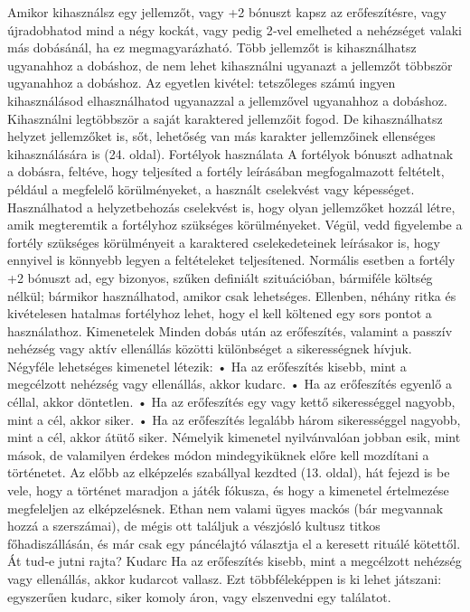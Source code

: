 \documentclass[oneside]{book}
\begin{document}
Amikor kihasználsz egy jellemzőt, vagy +2 bónuszt kapsz az erőfeszítésre, vagy újradobhatod mind a négy kockát, vagy pedig 2‑vel emelheted a nehézséget valaki más dobásánál, ha ez megmagyarázható. Több jellemzőt is kihasználhatsz ugyanahhoz a dobáshoz, de nem lehet kihasználni ugyanazt a jellemzőt többször ugyanahhoz a dobáshoz. Az egyetlen kivétel: tetszőleges számú ingyen kihasználásod elhasználhatod ugyanazzal a jellemzővel ugyanahhoz a dobáshoz.
Kihasználni legtöbbször a saját karaktered jellemzőit fogod. De kihasználhatsz helyzet jellemzőket is, sőt, lehetőség van más karakter jellemzőinek ellenséges kihasználására is (24. oldal).
Fortélyok használata
A fortélyok bónuszt adhatnak a dobásra, feltéve, hogy teljesíted a fortély leírásában megfogalmazott feltételt, például a megfelelő körülményeket, a használt cselekvést vagy képességet. Használhatod a helyzetbehozás cselekvést is, hogy olyan jellemzőket hozzál létre, amik megteremtik a fortélyhoz szükséges körülményeket. Végül, vedd figyelembe a fortély szükséges körülményeit a karaktered cselekedeteinek leírásakor is, hogy ennyivel is könnyebb legyen a feltételeket teljesítened.
Normális esetben a fortély +2 bónuszt ad, egy bizonyos, szűken definiált szituációban, bármiféle költség nélkül; bármikor használhatod, amikor csak lehetséges. Ellenben, néhány ritka és kivételesen hatalmas fortélyhoz lehet, hogy el kell költened egy sors pontot a használathoz.
Kimenetelek
Minden dobás után az erőfeszítés, valamint a passzív nehézség vagy aktív ellenállás közötti különbséget a sikerességnek hívjuk. Négyféle lehetséges kimenetel létezik:
    • Ha az erőfeszítés kisebb, mint a megcélzott nehézség vagy ellenállás, akkor kudarc.
    • Ha az erőfeszítés egyenlő a céllal, akkor döntetlen.
    • Ha az erőfeszítés egy vagy kettő sikerességgel nagyobb, mint a cél, akkor siker.
    • Ha az erőfeszítés legalább három sikerességgel nagyobb, mint a cél, akkor átütő siker.
Némelyik kimenetel nyilvánvalóan jobban esik, mint mások, de valamilyen érdekes módon mindegyiküknek előre kell mozdítani a történetet. Az előbb az elképzelés szabállyal kezdted (13. oldal), hát fejezd is be vele, hogy a történet maradjon a játék fókusza, és hogy a kimenetel értelmezése megfeleljen az elképzelésnek.
Ethan nem valami ügyes mackós (bár megvannak hozzá a szerszámai), de mégis ott találjuk a vészjósló kultusz titkos főhadiszállásán, és már csak egy páncélajtó választja el a keresett rituálé kötettől. Át tud‑e jutni rajta?
Kudarc
Ha az erőfeszítés kisebb, mint a megcélzott nehézség vagy ellenállás, akkor kudarcot vallasz.
Ezt többféleképpen is ki lehet játszani: egyszerűen kudarc, siker komoly áron, vagy elszenvedni egy találatot.
\end{document}
